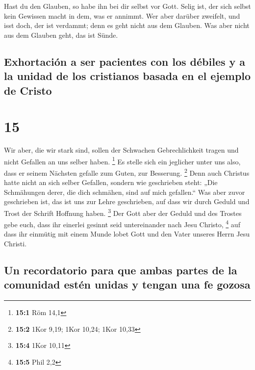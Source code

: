  Hast du den Glauben, so habe ihn bei dir selbst vor
Gott. Selig ist, der sich selbst kein Gewissen macht in dem, was er
annimmt.  Wer aber darüber zweifelt, und isst doch, der
ist verdammt; denn es geht nicht aus dem Glauben. Was aber nicht aus dem
Glauben geht, das ist Sünde.

\hypertarget{exhortaciuxf3n-a-ser-pacientes-con-los-duxe9biles-y-a-la-unidad-de-los-cristianos-basada-en-el-ejemplo-de-cristo}{%
\subsection{Exhortación a ser pacientes con los débiles y a la unidad de
los cristianos basada en el ejemplo de
Cristo}\label{exhortaciuxf3n-a-ser-pacientes-con-los-duxe9biles-y-a-la-unidad-de-los-cristianos-basada-en-el-ejemplo-de-cristo}}

\hypertarget{section-14}{%
\section{15}\label{section-14}}

 Wir aber, die wir stark sind, sollen der Schwachen
Gebrechlichkeit tragen und nicht Gefallen an uns selber haben.
\footnote{\textbf{15:1} Röm 14,1}  Es stelle sich ein
jeglicher unter uns also, dass er seinem Nächsten gefalle zum Guten, zur
Besserung. \footnote{\textbf{15:2} 1Kor 9,19; 1Kor 10,24; 1Kor 10,33}
 Denn auch Christus hatte nicht an sich selber Gefallen,
sondern wie geschrieben steht: „Die Schmähungen derer, die dich
schmähen, sind auf mich gefallen.``  Was aber zuvor
geschrieben ist, das ist uns zur Lehre geschrieben, auf dass wir durch
Geduld und Trost der Schrift Hoffnung haben. \footnote{\textbf{15:4}
  1Kor 10,11}  Der Gott aber der Geduld und des Trostes
gebe euch, dass ihr einerlei gesinnt seid untereinander nach Jesu
Christo, \footnote{\textbf{15:5} Phil 2,2}  auf dass ihr
einmütig mit einem Munde lobet Gott und den Vater unseres Herrn Jesu
Christi.

\hypertarget{un-recordatorio-para-que-ambas-partes-de-la-comunidad-estuxe9n-unidas-y-tengan-una-fe-gozosa}{%
\subsection{Un recordatorio para que ambas partes de la comunidad estén
unidas y tengan una fe
gozosa}\label{un-recordatorio-para-que-ambas-partes-de-la-comunidad-estuxe9n-unidas-y-tengan-una-fe-gozosa}}

